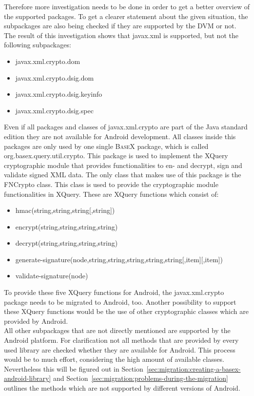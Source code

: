 Therefore more investigation needs to be done in order to get a better overview of the supported packages.
To get a clearer statement about the given situation, the subpackages are also being checked if they are supported by the DVM or not.
The result of this investigation shows that \textsf{javax.xml} is supported, but not the following subpackages:
\begin{itemize}
	\item \textsf{javax.xml.crypto.dom}
	\item \textsf{javax.xml.crypto.dsig.dom}
	\item \textsf{javax.xml.crypto.dsig.keyinfo}
	\item \textsf{javax.xml.crypto.dsig.spec}
\end{itemize}
Even if all packages and classes of \textsf{javax.xml.crypto} are part of the Java standard edition they are not available for Android development.
All classes inside this packages are only used by one single \textsc{BaseX} package, which is called \textsf{org.basex.query.\-util.crypto}.
This package is used to implement the XQuery cryptographic module that provides functionalities to en- and decrypt, sign and validate signed XML data.
The only class that makes use of this package is the \textsf{FNCrypto} class.
This class is used to provide the cryptographic module functionalities in XQuery.
These are XQuery functions which consist of:
\begin{itemize}
	\item \textsf{hmac(string,string,string[,string])}
	\item \textsf{encrypt(string,string,string,string)}
	\item \textsf{decrypt(string,string,string,string)}
	\item \textsf{generate-signature(node,string,string,string,string,string[,item][,item])}
	\item \textsf{validate-signature(node)}
\end{itemize}
To provide these five XQuery functions for Android, the \textsf{javax.xml.crypto} package needs to be migrated to Android, too.
Another possibility to support these XQuery functions would be the use of other cryptographic classes which are provided by Android.\\
All other subpackages that are not directly mentioned are supported by the Android platform.
For clarification not all methods that are provided by every used library are checked whether they are available for Android.
This process would be to much effort, considering the high amount of available classes.
Nevertheless this will be figured out in Section~\ref{sec:migration:creating-a-basex-android-library} and Section~\ref{sec:migration:problems-during-the-migration} outlines the methods which are not supported by different versions of Android.

